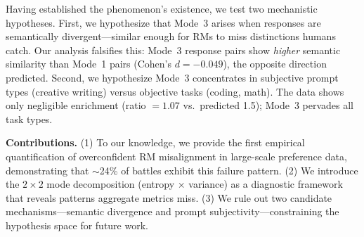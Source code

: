 Having established the phenomenon's existence, we test two mechanistic hypotheses. First, we hypothesize that Mode~3 arises when responses are semantically divergent---similar enough for RMs to miss distinctions humans catch. Our analysis falsifies this: Mode~3 response pairs show \emph{higher} semantic similarity than Mode~1 pairs (Cohen's $d = -0.049$), the opposite direction predicted. Second, we hypothesize Mode~3 concentrates in subjective prompt types (creative writing) versus objective tasks (coding, math). The data shows only negligible enrichment (ratio $= 1.07$ vs.\ predicted 1.5); Mode~3 pervades all task types.

\textbf{Contributions.} (1) To our knowledge, we provide the first empirical quantification of overconfident RM misalignment in large-scale preference data, demonstrating that $\sim$24\% of battles exhibit this failure pattern. (2) We introduce the $2\times2$ mode decomposition (entropy $\times$ variance) as a diagnostic framework that reveals patterns aggregate metrics miss. (3) We rule out two candidate mechanisms---semantic divergence and prompt subjectivity---constraining the hypothesis space for future work.
